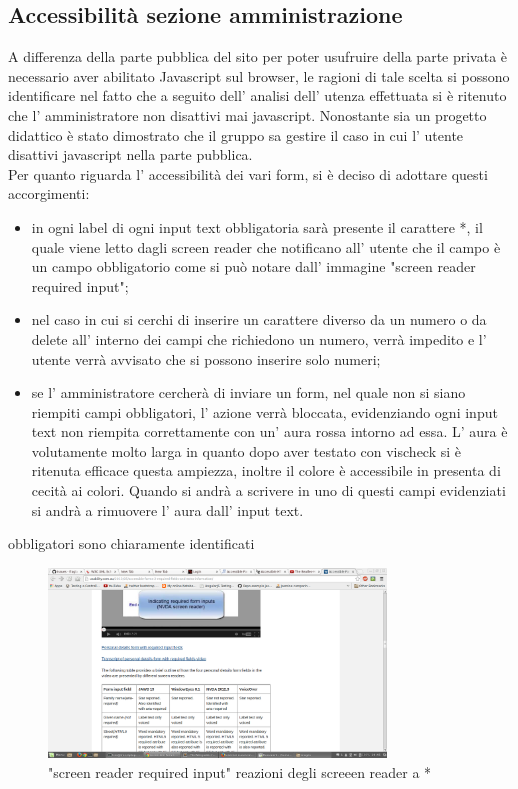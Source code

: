 \subsection{Accessibilità sezione amministrazione}
A differenza della parte pubblica del sito per poter usufruire della parte privata è necessario aver abilitato Javascript sul browser, le ragioni di tale scelta si possono identificare nel fatto che a seguito dell' analisi dell' utenza effettuata si è ritenuto che l' amministratore non disattivi mai javascript. Nonostante sia un progetto didattico è stato dimostrato che il gruppo sa gestire il caso in cui l' utente disattivi javascript nella parte pubblica.
\\
Per quanto riguarda l' accessibilità dei vari form, si è deciso di adottare questi accorgimenti:
\begin{itemize}
 \item in ogni label di ogni input text obbligatoria sarà presente il carattere *, il quale viene letto dagli screen reader che notificano all' utente che il campo è un campo obbligatorio come si può notare dall' immagine "screen reader required input";
 \item nel caso in cui si cerchi di inserire un carattere diverso da un numero o da delete all' interno dei campi che richiedono un numero, verrà impedito e l' utente verrà avvisato che si possono inserire solo numeri;
 \item se l' amministratore cercherà di inviare un form, nel quale non si siano riempiti campi obbligatori, l' azione verrà bloccata, evidenziando ogni input text non riempita correttamente con un' aura rossa intorno ad essa. L' aura è volutamente molto larga in quanto dopo aver testato con vischeck si è ritenuta efficace questa ampiezza, inoltre il colore è accessibile in presenta di cecità ai colori. Quando si andrà a scrivere in uno di questi campi evidenziati si andrà a rimuovere l' aura dall' input text. 
\end{itemize} obbligatori sono chiaramente identificati
\begin{figure}[H]
		\centering \includegraphics[width=0.8\textwidth]{images/required.png}
		\caption{"screen reader required input" reazioni degli screeen reader a *}
	\end{figure}
